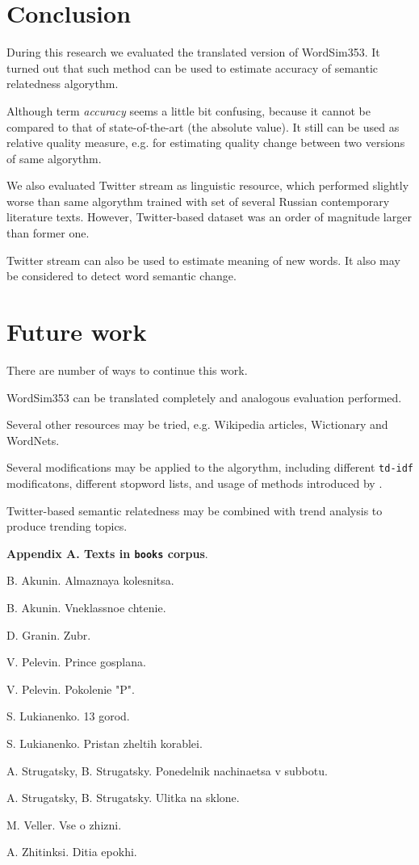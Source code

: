 \documentclass[11pt,letterpaper]{article}
\begin{document}
\section{Conclusion}

During this research we evaluated the translated version of WordSim353.
It turned out that such method can be used to estimate accuracy
of semantic relatedness algorythm. 

Although term {\em accuracy} seems a little bit confusing, because it cannot 
be compared to that of state-of-the-art (the absolute value). 
It still can be used as relative
quality measure, e.g. for estimating quality change between two versions
of same algorythm.

We also evaluated Twitter stream as linguistic resource, which performed
slightly worse than same algorythm trained with set of several Russian contemporary
literature texts. However, Twitter-based dataset was an order of magnitude larger
than former one. 

Twitter stream can also be used to estimate meaning of new words.
It also may be considered to detect word semantic change.

\section{Future work}

There are number of ways to continue this work.

WordSim353 can be translated completely and analogous evaluation performed.

Several other resources may be tried, e.g. Wikipedia articles, Wictionary and 
WordNets.

Several modifications may be applied to the algorythm, including different
{\tt td-idf} modificatons, different stopword lists, and usage of methods
introduced by \cite{mikolov2013efficient}.  

Twitter-based semantic relatedness may be combined with trend analysis to
produce trending topics.




{\bf Appendix A. Texts in {\tt books} corpus}.

B. Akunin. Almaznaya kolesnitsa. 

B. Akunin. Vneklassnoe chtenie.

D. Granin. Zubr. 

V. Pelevin. Prince gosplana.

V. Pelevin. Pokolenie "P". 

S. Lukianenko. 13 gorod.

S. Lukianenko. Pristan zheltih korablei.

A. Strugatsky, B. Strugatsky. Ponedelnik nachinaetsa v subbotu.

A. Strugatsky, B. Strugatsky. Ulitka na sklone. 

M. Veller. Vse o zhizni.

A. Zhitinksi. Ditia epokhi.
\end{document}
